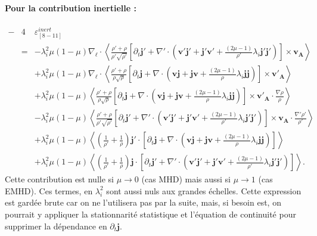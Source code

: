 \paragraph{Pour la contribution inertielle :} 
\begin{eqnarray}
  \label{eq:turb_bin_TEMN} - &4&  \varepsilon^{inert}_{[8-11]} \\
    &=&- \lambda_i^2\mu \left(1-\mu\right)\nabla_{\boldsymbol{\ell}} \cdot \left< \frac{\rho' + \rho}{\rho'\sqrt{\rho'}} \left[\partial_t \boldsymbol{j'} + \nabla' \cdot \left( \boldsymbol{v'}  \boldsymbol{j'}  + \boldsymbol{j'}  \boldsymbol{v'} +\frac{ \left(2\mu -1 \right)}{\rho'} \lambda_i  \boldsymbol{j'} \boldsymbol{j'}   \right)\right]\times \boldsymbol{v_A}  \right>\nonumber\\ 
  &&+ \lambda_i^2\mu \left(1-\mu\right) \nabla_{\boldsymbol{\ell}} \cdot \left< \frac{\rho' + \rho}{\rho\sqrt{\rho}} \left[\partial_t \boldsymbol{j} +\nabla \cdot \left( \boldsymbol{v}  \boldsymbol{j}   + \boldsymbol{j}  \boldsymbol{v} +\frac{ \left(2\mu -1 \right)}{\rho} \lambda_i  \boldsymbol{j} \boldsymbol{j} \right)\right]\times \boldsymbol{v'_A}  \right>  \nonumber\\ 
  &&+ \lambda_i^2\mu \left(1-\mu\right)\left<\frac{\rho' + \rho}{\rho\sqrt{\rho}} \left[\partial_t \boldsymbol{j} +\nabla \cdot \left( \boldsymbol{v}  \boldsymbol{j}   + \boldsymbol{j}  \boldsymbol{v} +\frac{ \left(2\mu -1 \right)}{\rho} \lambda_i  \boldsymbol{j} \boldsymbol{j} \right)\right]\times \boldsymbol{v'_A}  \cdot \frac{\nabla  \rho }{\rho}\right>  \nonumber\\ 
  &&- \lambda_i^2\mu \left(1-\mu\right)\left<\frac{\rho' + \rho}{\rho'\sqrt{\rho'}} \left[\partial_t \boldsymbol{j'} + \nabla' \cdot \left( \boldsymbol{v'}  \boldsymbol{j'}  + \boldsymbol{j'}  \boldsymbol{v'} +\frac{ \left(2\mu -1 \right)}{\rho'} \lambda_i  \boldsymbol{j'} \boldsymbol{j'}   \right)\right]\times \boldsymbol{v_A}  \cdot \frac{\nabla'  \rho' }{\rho'}\right> \nonumber\\
         &&+ \lambda_i^2\mu \left(1-\mu\right) \left< \left(\frac{1}{\rho'} + \frac{1}{\rho}\right) \boldsymbol{j'} \cdot   \left[\partial_t \boldsymbol{j} +\nabla \cdot \left( \boldsymbol{v}  \boldsymbol{j}   + \boldsymbol{j}  \boldsymbol{v} +\frac{ \left(2\mu -1 \right)}{\rho} \lambda_i  \boldsymbol{j} \boldsymbol{j} \right)\right]\right> \nonumber\\
         &&+ \lambda_i^2 \mu \left(1-\mu\right) \left<\left(\frac{1}{\rho'} + \frac{1}{\rho}\right) \boldsymbol{j} \cdot \left[\partial_t \boldsymbol{j'} + \nabla' \cdot \left( \boldsymbol{v'}  \boldsymbol{j'}  + \boldsymbol{j'}  \boldsymbol{v'} +\frac{ \left(2\mu -1 \right)}{\rho'} \lambda_i  \boldsymbol{j'} \boldsymbol{j'}   \right)\right]\right>.\nonumber 
\end{eqnarray}
Cette contribution est nulle si $\mu \rightarrow 0$ (cas \ac{MHD}) mais aussi si $\mu \rightarrow 1$ (cas \acs{EMHD}). Ces termes, en $\lambda_i^2$ sont aussi nuls aux grandes échelles.
Cette expression est gardée brute car on ne l'utilisera pas par la suite, mais, si besoin est, on pourrait y appliquer la stationnarité statistique et l'équation de continuité pour supprimer la dépendance en $\partial_t \boldsymbol{j}$.


